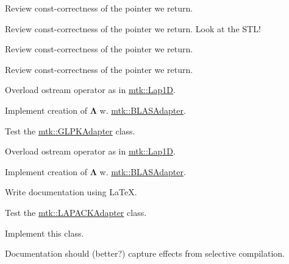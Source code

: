 \begin{DoxyRefList}
\item[\label{todo__todo000007}%
\hypertarget{todo__todo000007}{}%
Member \hyperlink{classmtk_1_1UniStgGrid1D_aa1999580cb98c19950e951510871cc90}{mtk\+:\+:Uni\+Stg\+Grid1\+D\+:\+:discrete\+\_\+domain\+\_\+x} () const ]Review const-\/correctness of the pointer we return.  
\item[\label{todo__todo000008}%
\hypertarget{todo__todo000008}{}%
Member \hyperlink{classmtk_1_1UniStgGrid1D_acf28d702f6e702599986afcb253bbfc1}{mtk\+:\+:Uni\+Stg\+Grid1\+D\+:\+:discrete\+\_\+field\+\_\+u} ()]Review const-\/correctness of the pointer we return. Look at the S\+T\+L!  
\item[\label{todo__todo000010}%
\hypertarget{todo__todo000010}{}%
Member \hyperlink{classmtk_1_1UniStgGrid2D_ab2f70cf5cd0a2d5486992d9f2f8baa4a}{mtk\+:\+:Uni\+Stg\+Grid2\+D\+:\+:discrete\+\_\+domain\+\_\+x} () const ]Review const-\/correctness of the pointer we return.  
\item[\label{todo__todo000011}%
\hypertarget{todo__todo000011}{}%
Member \hyperlink{classmtk_1_1UniStgGrid2D_ac33a58d65105550dcf6f6b92b48b5105}{mtk\+:\+:Uni\+Stg\+Grid2\+D\+:\+:discrete\+\_\+domain\+\_\+y} () const ]Review const-\/correctness of the pointer we return.  
\item[\label{todo__todo000015}%
\hypertarget{todo__todo000015}{}%
File \hyperlink{mtk__div__1d_8cc}{mtk\+\_\+div\+\_\+1d.cc} ]Overload ostream operator as in \hyperlink{classmtk_1_1Lap1D}{mtk\+::\+Lap1\+D}.

Implement creation of $ \mathbf{\Lambda}$ w. \hyperlink{classmtk_1_1BLASAdapter}{mtk\+::\+B\+L\+A\+S\+Adapter}.  
\item[\label{todo__todo000024}%
\hypertarget{todo__todo000024}{}%
File \hyperlink{mtk__glpk__adapter__test_8cc}{mtk\+\_\+glpk\+\_\+adapter\+\_\+test.cc} ]Test the \hyperlink{classmtk_1_1GLPKAdapter}{mtk\+::\+G\+L\+P\+K\+Adapter} class.  
\item[\label{todo__todo000017}%
\hypertarget{todo__todo000017}{}%
File \hyperlink{mtk__grad__1d_8cc}{mtk\+\_\+grad\+\_\+1d.cc} ]Overload ostream operator as in \hyperlink{classmtk_1_1Lap1D}{mtk\+::\+Lap1\+D}.

Implement creation of $ \mathbf{\Lambda}$ w. \hyperlink{classmtk_1_1BLASAdapter}{mtk\+::\+B\+L\+A\+S\+Adapter}.  
\item[\label{todo__todo000019}%
\hypertarget{todo__todo000019}{}%
File \hyperlink{mtk__lapack__adapter_8cc}{mtk\+\_\+lapack\+\_\+adapter.cc} ]Write documentation using La\+Te\+X. 
\item[\label{todo__todo000025}%
\hypertarget{todo__todo000025}{}%
File \hyperlink{mtk__lapack__adapter__test_8cc}{mtk\+\_\+lapack\+\_\+adapter\+\_\+test.cc} ]Test the \hyperlink{classmtk_1_1LAPACKAdapter}{mtk\+::\+L\+A\+P\+A\+C\+K\+Adapter} class.  
\item[\label{todo__todo000003}%
\hypertarget{todo__todo000003}{}%
File \hyperlink{mtk__quad__1d_8h}{mtk\+\_\+quad\+\_\+1d.h} ]Implement this class.  
\item[\label{todo__todo000004}%
\hypertarget{todo__todo000004}{}%
File \hyperlink{mtk__roots_8h}{mtk\+\_\+roots.h} ]Documentation should (better?) capture effects from selective compilation.


\end{DoxyRefList}
